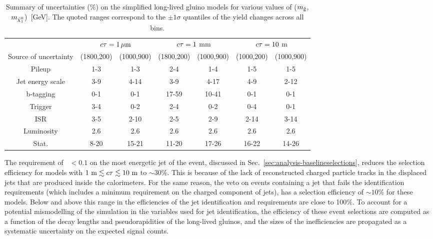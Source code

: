 \begin{table}[t]
\centering
\footnotesize
\begin{tabular}{c|cc|cc|cc}
\hline
& \multicolumn{2}{c|}{$c\tau=1\,{\mu}\text{m}$} & \multicolumn{2}{c|}{$c\tau=1$ mm} & 
\multicolumn{2}{c}{$c\tau=10$ m} \\
Source of uncertainty & (1800,200) & (1000,900) & (1800,200) & 
(1000,900) & (1000,200) & (1000,900) \\   
\hline
Pileup & 1-3 & 1-3 & 2-4 & 1-4 & 1-5 & 1-5 \\
Jet energy scale & 3-9 & 4-14 & 3-9 & 4-17 & 4-9 & 2-12 \\
b-tagging & 0-1 & 0-1 & 17-59 & 10-41 & 0-1 & 0-1 \\
Trigger & 3-4 & 0-2 & 2-4 & 0-2 & 0-4 & 0-1 \\
ISR & 3-5 & 2-10 & 2-5 & 2-9 & 2-14 & 3-14 \\
Luminosity & 2.6 & 2.6 & 2.6 & 2.6 & 2.6 & 2.6 \\
Stat. & 8-20 & 15-21 & 11-20 & 17-26 & 16-22 & 14-26 \\
\hline
\end{tabular}
\caption{Summary of uncertainties (\%) on the simplified long-lived gluino 
models for various values of ($m_{\mathrm{\tilde{g}}}$,$m_{\tilde{\chi}_1^0}$)~[GeV]. The 
quoted ranges correspond to the $\pm1\sigma$ quantiles of the yield changes 
across all \njnbhtmht bins.}
\label{tab:systs-signal}
\end{table}


The requirement of \chf~$<0.1$ on the most energetic jet of the event, 
discussed in Sec.~\ref{sec:analysis-baselineselections}, reduces the selection 
efficiency for models with $1~\mathrm{m} \lesssim c\tau \lesssim 
10~\mathrm{m}$ to $\sim30\%$. This is because of the lack of reconstructed 
charged particle tracks in the displaced jets that are produced inside the 
calorimeters. 
For the same reason, the veto on events containing a jet that fails the 
identification requirements (which includes a minimum requirement on the 
charged component of jets), has a selection efficiency of $\sim10\%$ for these 
models.
Below and above this range in \ctau the efficiencies of the jet identification 
and \chf requirements are close to 100\%.
To account for a potential mismodelling of the simulation in the variables used 
for jet identification, the efficiency of these event selections are computed 
as a function of the decay lengths and pseudorapidities of the long-lived 
gluinos, and the sizes of the inefficiencies are propagated as a systematic 
uncertainty on the expected signal counts. 

